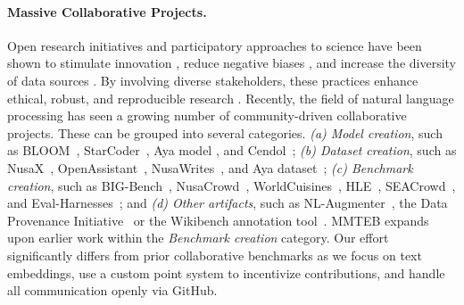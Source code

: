 \paragraph{Massive Collaborative Projects.}
Open research initiatives and participatory approaches to science have been shown to stimulate innovation \citep{Park2023PapersAP}, reduce negative biases \citep{gudowsky2021limits, gomez2022leading}, and increase the diversity of data sources \citep{hanley2020ethical,singh2024aya,winata2024worldcuisines}. By involving diverse stakeholders, these practices enhance ethical, robust, and reproducible research \citep{hagerty2019global}. Recently, the field of natural language processing has seen a growing number of community-driven collaborative projects. These can be grouped into several categories. \emph{(a) Model creation}, such as BLOOM~\citep{workshop2023bloom,muennighoff2023crosslingual}, StarCoder~\citep{li2023starcoder,lozhkov2024starcoder2stackv2}, Aya model \citep{ustun2024aya}, and Cendol~\citep{cahyawijaya2024cendol}; \emph{(b) Dataset creation}, such as NusaX~\citep{winata2023nusax}, OpenAssistant~\citep{köpf2023openassistant}, NusaWrites~\citep{cahyawijaya2023nusawrites}, and Aya dataset~\citep{singh2024aya}; \emph{(c) Benchmark creation}, such as BIG-Bench~\citep{srivastava2022beyond}, NusaCrowd~\citep{cahyawijaya2023nusacrowd}, WorldCuisines~\citep{winata2024worldcuisines}, HLE~\citep{phan2025humanitysexam}, SEACrowd~\citep{lovenia2024seacrowd}, and Eval-Harnesses~\citep{eval-harness,bigcode-evaluation-harness,biderman2024lessons}; and \emph{(d) Other artifacts}, such as NL-Augmenter~\citep{dhole2022nlaugmenter}, the Data Provenance Initiative~\citep{longpre2023data,longpre2024consentcrisisrapiddecline,longpre2024bridgingdataprovenancegap} or the Wikibench annotation tool~\citep{Kuo2024ACM}. MMTEB expands upon earlier work within the \emph{Benchmark creation} category. Our effort significantly differs from prior collaborative benchmarks as we focus on text embeddings, use a custom point system to incentivize contributions, and handle all communication openly via GitHub.
